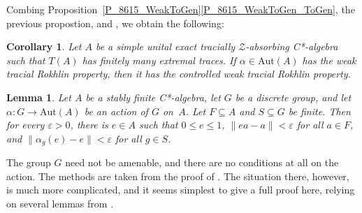 \documentclass[11pt]{amsart}
\theoremstyle{plain}
\newtheorem{lemma}[theorem]{Lemma}
\newtheorem{corollary}[theorem]{Corollary}
\theoremstyle{definition}
\theoremstyle{remark}
\numberwithin{equation}{section}
\begin{document}
Combing Proposition~\ref{P_8615_WeakToGen}\ref{P_8615_WeakToGen_ToGen},
 the previous propostion, and \cite[Remark~6.8]{HO13}, we obtain 
 the following:

\begin{corollary}\label{cor_cwtrp}
Let $A$ be a  simple unital exact
tracially $\mathcal{Z}$-absorbing C*-algebra
such that $T(A)$ has finitely many extremal traces.
If $\alpha \in \mathrm{Aut} (A)$
has the weak tracial Rokhlin property,
then it has the controlled weak tracial Rokhlin property.
\end{corollary}

\begin{lemma}\label{L_8612_AppInv}
Let $A$ be a stably finite C*-algebra,
let $G$ be a discrete group,
and let $\alpha \colon G \to {\mathrm{Aut}} (A)$
be an action of $G$ on~$A$.
Let $F \subseteq A$
and $S \subseteq G$ be finite.
Then for every $\varepsilon > 0$,
there is $e \in A$
such that $0 \leq e \leq 1$,
$\| e a - a \| < \varepsilon$
for all $a \in F$,
and $\| \alpha_g (e) - e \| < \varepsilon$
for all $g \in S$.
\end{lemma}

The group $G$ need not be amenable,
and there are no conditions at all on the action.
The methods are taken from the proof of \cite[Theorem 4.6]{AP16}.
The situation there,
however, is much more complicated,
and it seems simplest to give a full proof here,
relying on several lemmas from \cite{AP16}.
\end{document}
